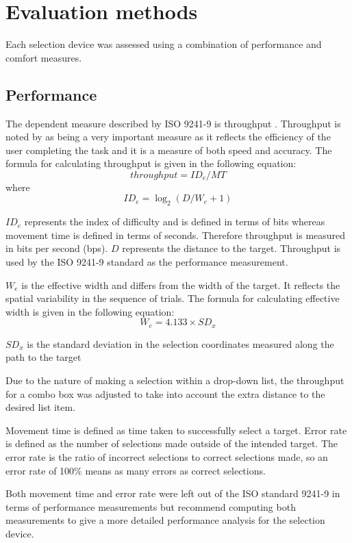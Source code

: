 \documentclass{elsart}
\begin{document}
\section{Evaluation methods}
\label{sec-evaluation}

Each selection device was assessed using a combination of performance
and comfort measures.

\subsection{Performance}
\label{sec-evaluation-performance}

The dependent measure described by ISO 9241-9 is throughput
\citep{ISO-2000-9241-9}. Throughput is noted by
\citet{Mack-IS-2001-EHCI} as being a very important measure as it
reflects the efficiency of the user completing the task and it is a
measure of both speed and accuracy. The formula for calculating
throughput is given in the following equation:
\[
	\mathit{throughput} = \mathit{ID}_{e} / \mathit{MT}
\]
where
\[
	\mathit{ID}_{e} = \log_{2}(D / W_{e} + 1)
\]

\(\mathit{ID}_{e}\) represents the index of difficulty and is defined in
terms of bits whereas movement time is defined in terms of seconds.
Therefore throughput is measured in bits per second (bps). \(D\)
represents the distance to the target. Throughput is used by the ISO
9241-9 standard as the performance measurement.

\(W_{e}\) is the effective width and differs from the width of the
target. It reflects the spatial variability in the sequence of trials.
The formula for calculating effective width is given in the following
equation:
\[
	W_{e} = 4.133 \times \mathit{SD}_{x}
\]
	
\(\mathit{SD}_{x}\) is the standard deviation in the selection
coordinates measured along the path to the target

Due to the nature of making a selection within a drop-down list, the
throughput for a combo box was adjusted to take into account the extra
distance to the desired list item.

Movement time is defined as time taken to successfully select a target.
Error rate is defined as the number of selections made outside of the
intended target. The error rate is the ratio of incorrect selections to
correct selections made, so an error rate of 100\% means as many errors
as correct selections.

Both movement time and error rate were left out of the ISO standard
9241-9 in terms of performance measurements but \citet{Doug-SA-1999-CHI}
recommend computing both measurements to give a more detailed
performance analysis for the selection device.
\end{document}
